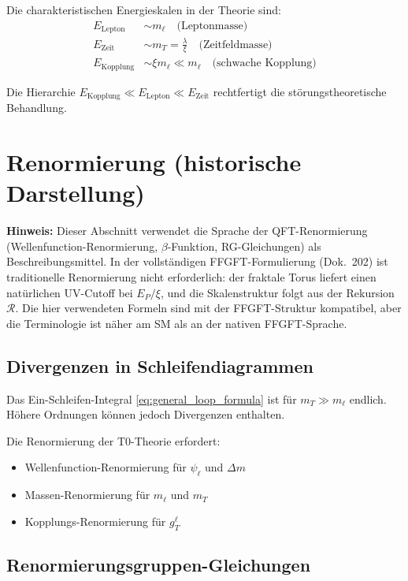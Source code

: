 	Die charakteristischen Energieskalen in der Theorie sind:
	\begin{align}
		E_{\text{Lepton}} &\sim m_\ell \quad \text{(Leptonmasse)} \label{eq:lepton_scale} \\
		E_{\text{Zeit}} &\sim m_T = \frac{\lambda}{\xi} \quad \text{(Zeitfeldmasse)} \label{eq:time_scale} \\
		E_{\text{Kopplung}} &\sim \xi m_\ell \ll m_\ell \quad \text{(schwache Kopplung)} \label{eq:coupling_scale}
	\end{align}
	
	Die Hierarchie $E_{\text{Kopplung}} \ll E_{\text{Lepton}} \ll E_{\text{Zeit}}$ rechtfertigt die störungstheoretische Behandlung.
	
	\section{Renormierung (historische Darstellung)}

\textbf{Hinweis:} Dieser Abschnitt verwendet die Sprache der QFT-Renormierung (Wellenfunction-Renormierung, $\beta$-Funktion, RG-Gleichungen) als Beschreibungsmittel. In der vollständigen FFGFT-Formulierung (Dok.~202) ist traditionelle Renormierung nicht erforderlich: der fraktale Torus liefert einen natürlichen UV-Cutoff bei $E_P/\xi$, und die Skalenstruktur folgt aus der Rekursion $\mathcal{R}$. Die hier verwendeten Formeln sind mit der FFGFT-Struktur kompatibel, aber die Terminologie ist näher am SM als an der nativen FFGFT-Sprache.
	
	\subsection{Divergenzen in Schleifendiagrammen}
	
	Das Ein-Schleifen-Integral \eqref{eq:general_loop_formula} ist für $m_T \gg m_\ell$ endlich. Höhere Ordnungen können jedoch Divergenzen enthalten.
	
	Die Renormierung der T0-Theorie erfordert:
	\begin{itemize}
		\item Wellenfunction-Renormierung für $\psi_\ell$ und $\Delta m$
		\item Massen-Renormierung für $m_\ell$ und $m_T$
		\item Kopplungs-Renormierung für $g_T^\ell$
	\end{itemize}
	
	\subsection{Renormierungsgruppen-Gleichungen}
	
